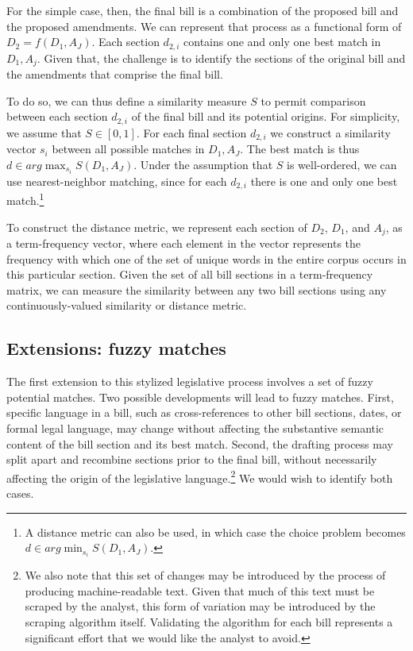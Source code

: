 \documentclass[11pt]{article}
\begin{document}
For the simple case, then, the final bill is a
combination of the proposed bill and the proposed
amendments. We can represent that process as a functional form of $D_2
= f(D_1, A_J)$. Each section $d_{2,i}$ contains one and only one best
match in $D_1, A_j$. Given that, the challenge is to identify the sections
of the original bill and the amendments that comprise the final
bill. 

To do so, we can thus define a similarity measure $S$ to permit comparison
between each section $d_{2,i}$ of the final bill and its potential origins. For simplicity, we
assume that $S \in [0,1]$. For each final section $d_{2,i}$ we
construct a similarity vector $s_i$ between all possible matches in
$D_1, A_J$. The best match is thus $d \in arg \max_{s_i} S(D_1,
A_J)$. Under the assumption that $S$ is well-ordered, we can use
nearest-neighbor matching, since for each $d_{2,i}$ there is one and
only one best match.\footnote{A distance metric can also be
used, in which case the choice problem becomes $d \in arg \min_{s_i}
S(D_1, A_J)$.}

To construct the distance metric, we represent each section of $D_2$,
$D_1$, and $A_j$, as a term-frequency vector, where each element in
the vector represents the frequency with which one of the set of
unique words in the entire corpus occurs in this particular
section. Given the set of all bill sections in a term-frequency
matrix, we can measure the similarity between any two bill sections
using any continuously-valued similarity or distance metric.

\subsection{Extensions: fuzzy matches}
\label{sec:extens-fuzzy-match}

The first extension to this stylized legislative process involves a
set of fuzzy potential matches. Two possible developments will lead to
fuzzy matches. First, specific language in a bill, such as
cross-references to other bill sections, dates, or formal legal
language, may change without affecting the substantive semantic
content of the bill section and its best match. Second, the drafting
process may split apart and recombine sections prior to the final
bill, without necessarily affecting the origin of the legislative
language.\footnote{We also note that this set of changes may be
  introduced by the process of producing machine-readable text. Given
  that much of this text must be scraped by the analyst, this form of
  variation may be introduced by the scraping algorithm
  itself. Validating the algorithm for each bill represents a
  significant effort that we would like the analyst to avoid.} We would wish to identify both cases.
\end{document}
